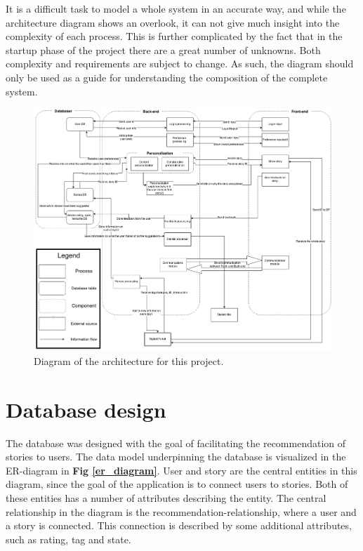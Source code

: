 It is a difficult task to model a whole system in an accurate way, and while the architecture diagram shows an overlook, it can not give much insight into the complexity of each process. This is further complicated by the fact that in the startup phase of the project there are a great number of unknowns. Both complexity and requirements are subject to change. As such, the diagram should only be used as a guide for understanding the composition of the complete system.

\begin{figure}[h!]
	\centering
	\includegraphics[width=\textwidth]{fig/architecture}
	\caption{Diagram of the architecture for this project.}
	\label{architecture}
\end{figure}

\section{Database design}

The database was designed with the goal of facilitating the recommendation of stories to users. The data model underpinning the database is visualized in the ER-diagram in \textbf{Fig \ref{er_diagram}}. User and story are the central entities in this diagram, since the goal of the application is to connect users to stories. Both of these entities has a number of attributes describing the entity. The central relationship in the diagram is the recommendation-relationship, where a user and a story is connected. This connection is described by some additional attributes, such as rating, tag and state. \newline


